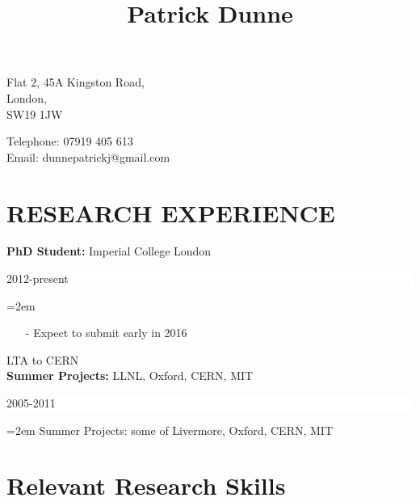 \documentclass[12pt]{article}
\newcommand{\EducationEntry}[4]{
        \noindent \textbf{#1:} #3 \hfill      %
        \colorbox{White}{\parbox{6em}{\hfill\color{Black}#2}} \par  %
        \noindent\hangindent=2em\hangafter=0 \small #4 %
        \normalsize \par}
\begin{document}
\title{Patrick Dunne}
\author{}
\date{}
\maketitle

\begin{multicols}{2}
  \raggedright
  Flat 2, 45A Kingston Road,\\
  London,\\
  SW19 1JW

  \columnbreak

  Telephone: 07919 405 613\\
  Email: dunnepatrickj@gmail.com
\end{multicols}

\section*{RESEARCH EXPERIENCE}
\EducationEntry{PhD Student}{2012-present}{Imperial College London}{
  \begin{itemize}
  \item[-] Expect to submit early in 2016
  \end{itemize}
}

LTA to CERN \\
\EducationEntry{Summer Projects}{2005-2011}{LLNL, Oxford, CERN, MIT}{
  Summer Projects: some of Livermore, Oxford, CERN, MIT
}

\section*{Relevant Research Skills}
\end{document}
